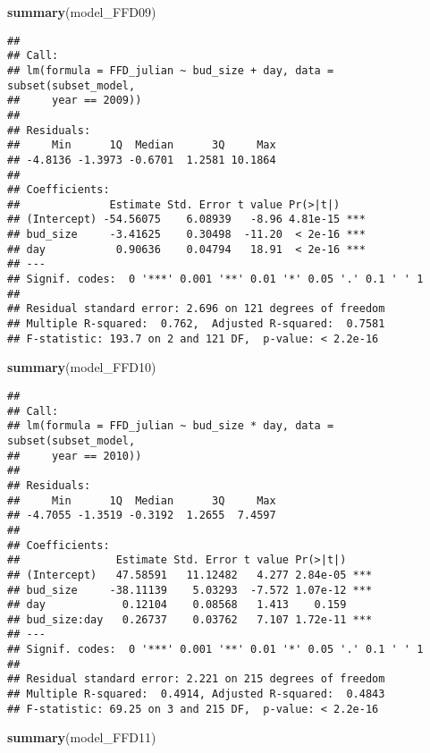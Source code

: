 \documentclass[]{article}
\newenvironment{Shaded}{\begin{snugshade}}{\end{snugshade}}
\newcommand{\KeywordTok}[1]{\textcolor[rgb]{0.13,0.29,0.53}{\textbf{#1}}}
\newcommand{\NormalTok}[1]{#1}
\begin{document}
\begin{Shaded}
\begin{Highlighting}[]
\KeywordTok{summary}\NormalTok{(model_FFD09)}
\end{Highlighting}
\end{Shaded}

\begin{verbatim}
## 
## Call:
## lm(formula = FFD_julian ~ bud_size + day, data = subset(subset_model, 
##     year == 2009))
## 
## Residuals:
##     Min      1Q  Median      3Q     Max 
## -4.8136 -1.3973 -0.6701  1.2581 10.1864 
## 
## Coefficients:
##              Estimate Std. Error t value Pr(>|t|)    
## (Intercept) -54.56075    6.08939   -8.96 4.81e-15 ***
## bud_size     -3.41625    0.30498  -11.20  < 2e-16 ***
## day           0.90636    0.04794   18.91  < 2e-16 ***
## ---
## Signif. codes:  0 '***' 0.001 '**' 0.01 '*' 0.05 '.' 0.1 ' ' 1
## 
## Residual standard error: 2.696 on 121 degrees of freedom
## Multiple R-squared:  0.762,  Adjusted R-squared:  0.7581 
## F-statistic: 193.7 on 2 and 121 DF,  p-value: < 2.2e-16
\end{verbatim}

\begin{Shaded}
\begin{Highlighting}[]
\KeywordTok{summary}\NormalTok{(model_FFD10)}
\end{Highlighting}
\end{Shaded}

\begin{verbatim}
## 
## Call:
## lm(formula = FFD_julian ~ bud_size * day, data = subset(subset_model, 
##     year == 2010))
## 
## Residuals:
##     Min      1Q  Median      3Q     Max 
## -4.7055 -1.3519 -0.3192  1.2655  7.4597 
## 
## Coefficients:
##               Estimate Std. Error t value Pr(>|t|)    
## (Intercept)   47.58591   11.12482   4.277 2.84e-05 ***
## bud_size     -38.11139    5.03293  -7.572 1.07e-12 ***
## day            0.12104    0.08568   1.413    0.159    
## bud_size:day   0.26737    0.03762   7.107 1.72e-11 ***
## ---
## Signif. codes:  0 '***' 0.001 '**' 0.01 '*' 0.05 '.' 0.1 ' ' 1
## 
## Residual standard error: 2.221 on 215 degrees of freedom
## Multiple R-squared:  0.4914, Adjusted R-squared:  0.4843 
## F-statistic: 69.25 on 3 and 215 DF,  p-value: < 2.2e-16
\end{verbatim}

\begin{Shaded}
\begin{Highlighting}[]
\KeywordTok{summary}\NormalTok{(model_FFD11)}
\end{Highlighting}
\end{Shaded}
\end{document}
